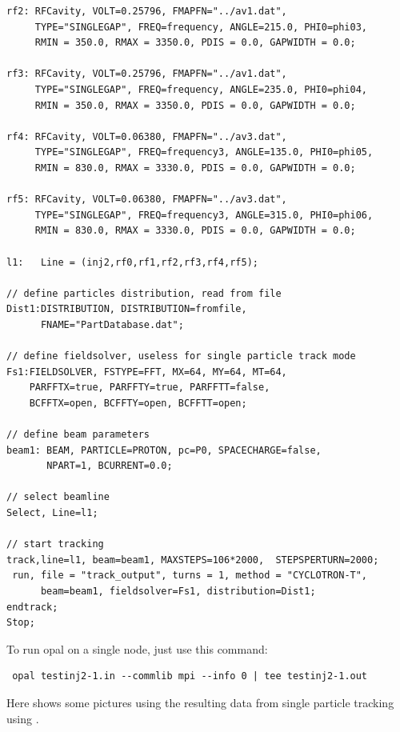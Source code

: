 \begin{fmpage}
\begin{footnotesize}
\begin{verbatim}
rf2: RFCavity, VOLT=0.25796, FMAPFN="../av1.dat", 
     TYPE="SINGLEGAP", FREQ=frequency, ANGLE=215.0, PHI0=phi03,  
     RMIN = 350.0, RMAX = 3350.0, PDIS = 0.0, GAPWIDTH = 0.0; 

rf3: RFCavity, VOLT=0.25796, FMAPFN="../av1.dat", 
     TYPE="SINGLEGAP", FREQ=frequency, ANGLE=235.0, PHI0=phi04,  
     RMIN = 350.0, RMAX = 3350.0, PDIS = 0.0, GAPWIDTH = 0.0; 

rf4: RFCavity, VOLT=0.06380, FMAPFN="../av3.dat", 
     TYPE="SINGLEGAP", FREQ=frequency3, ANGLE=135.0, PHI0=phi05,
     RMIN = 830.0, RMAX = 3330.0, PDIS = 0.0, GAPWIDTH = 0.0; 

rf5: RFCavity, VOLT=0.06380, FMAPFN="../av3.dat", 
     TYPE="SINGLEGAP", FREQ=frequency3, ANGLE=315.0, PHI0=phi06, 
     RMIN = 830.0, RMAX = 3330.0, PDIS = 0.0, GAPWIDTH = 0.0; 

l1:   Line = (inj2,rf0,rf1,rf2,rf3,rf4,rf5);

// define particles distribution, read from file
Dist1:DISTRIBUTION, DISTRIBUTION=fromfile, 
      FNAME="PartDatabase.dat"; 

// define fieldsolver, useless for single particle track mode 
Fs1:FIELDSOLVER, FSTYPE=FFT, MX=64, MY=64, MT=64, 
    PARFFTX=true, PARFFTY=true, PARFFTT=false,
    BCFFTX=open, BCFFTY=open, BCFFTT=open;
		 
// define beam parameters
beam1: BEAM, PARTICLE=PROTON, pc=P0, SPACECHARGE=false, 
       NPART=1, BCURRENT=0.0;

// select beamline
Select, Line=l1;

// start tracking
track,line=l1, beam=beam1, MAXSTEPS=106*2000,  STEPSPERTURN=2000;
 run, file = "track_output", turns = 1, method = "CYCLOTRON-T",
      beam=beam1, fieldsolver=Fs1, distribution=Dist1;
endtrack;
Stop;
\end{verbatim}
\end{footnotesize}
\end{fmpage}

To run opal on a single node, just use this command:
{ \footnotesize 
\begin{verbatim}
 opal testinj2-1.in --commlib mpi --info 0 | tee testinj2-1.out
\end{verbatim}
}
Here shows some pictures using the resulting data from single particle tracking using \opalcycl.

